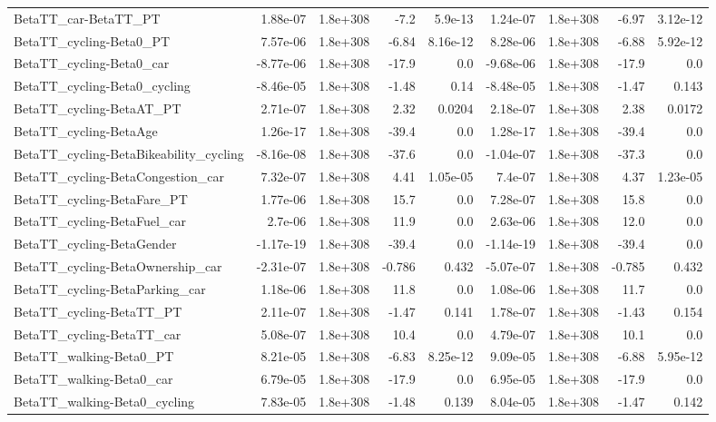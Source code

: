 \begin{tabular}{lrrrrrrrr}
BetaTT_car-BetaTT_PT & 1.88e-07 & 1.8e+308 & -7.2 & 5.9e-13 & 1.24e-07 & 1.8e+308 & -6.97 & 3.12e-12 \\
BetaTT_cycling-Beta0_PT & 7.57e-06 & 1.8e+308 & -6.84 & 8.16e-12 & 8.28e-06 & 1.8e+308 & -6.88 & 5.92e-12 \\
BetaTT_cycling-Beta0_car & -8.77e-06 & 1.8e+308 & -17.9 & 0.0 & -9.68e-06 & 1.8e+308 & -17.9 & 0.0 \\
BetaTT_cycling-Beta0_cycling & -8.46e-05 & 1.8e+308 & -1.48 & 0.14 & -8.48e-05 & 1.8e+308 & -1.47 & 0.143 \\
BetaTT_cycling-BetaAT_PT & 2.71e-07 & 1.8e+308 & 2.32 & 0.0204 & 2.18e-07 & 1.8e+308 & 2.38 & 0.0172 \\
BetaTT_cycling-BetaAge & 1.26e-17 & 1.8e+308 & -39.4 & 0.0 & 1.28e-17 & 1.8e+308 & -39.4 & 0.0 \\
BetaTT_cycling-BetaBikeability_cycling & -8.16e-08 & 1.8e+308 & -37.6 & 0.0 & -1.04e-07 & 1.8e+308 & -37.3 & 0.0 \\
BetaTT_cycling-BetaCongestion_car & 7.32e-07 & 1.8e+308 & 4.41 & 1.05e-05 & 7.4e-07 & 1.8e+308 & 4.37 & 1.23e-05 \\
BetaTT_cycling-BetaFare_PT & 1.77e-06 & 1.8e+308 & 15.7 & 0.0 & 7.28e-07 & 1.8e+308 & 15.8 & 0.0 \\
BetaTT_cycling-BetaFuel_car & 2.7e-06 & 1.8e+308 & 11.9 & 0.0 & 2.63e-06 & 1.8e+308 & 12.0 & 0.0 \\
BetaTT_cycling-BetaGender & -1.17e-19 & 1.8e+308 & -39.4 & 0.0 & -1.14e-19 & 1.8e+308 & -39.4 & 0.0 \\
BetaTT_cycling-BetaOwnership_car & -2.31e-07 & 1.8e+308 & -0.786 & 0.432 & -5.07e-07 & 1.8e+308 & -0.785 & 0.432 \\
BetaTT_cycling-BetaParking_car & 1.18e-06 & 1.8e+308 & 11.8 & 0.0 & 1.08e-06 & 1.8e+308 & 11.7 & 0.0 \\
BetaTT_cycling-BetaTT_PT & 2.11e-07 & 1.8e+308 & -1.47 & 0.141 & 1.78e-07 & 1.8e+308 & -1.43 & 0.154 \\
BetaTT_cycling-BetaTT_car & 5.08e-07 & 1.8e+308 & 10.4 & 0.0 & 4.79e-07 & 1.8e+308 & 10.1 & 0.0 \\
BetaTT_walking-Beta0_PT & 8.21e-05 & 1.8e+308 & -6.83 & 8.25e-12 & 9.09e-05 & 1.8e+308 & -6.88 & 5.95e-12 \\
BetaTT_walking-Beta0_car & 6.79e-05 & 1.8e+308 & -17.9 & 0.0 & 6.95e-05 & 1.8e+308 & -17.9 & 0.0 \\
BetaTT_walking-Beta0_cycling & 7.83e-05 & 1.8e+308 & -1.48 & 0.139 & 8.04e-05 & 1.8e+308 & -1.47 & 0.142 \\

\end{tabular}
